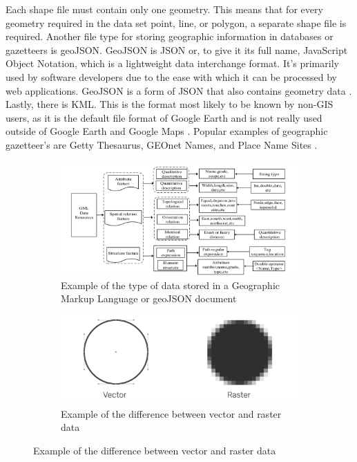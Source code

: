 \documentclass[10pt, conference, compsocconf]{IEEEtran}
\begin{document}
Each shape file must contain only one geometry. This means that for every geometry required in the data set point, line, or polygon, a separate shape file is required. Another file type for storing geographic information in databases or gazetteers is geoJSON. GeoJSON is JSON or, to give it its full name, JavaScript Object Notation, which is a lightweight data interchange format. It’s primarily used by software developers due to the ease with which it can be processed by web applications. GeoJSON is a form of JSON that also contains geometry data \cite{Butler:2016ev}. Lastly, there is KML. This is the format most likely to be known by non-GIS users, as it is the default file format of Google Earth and is not really used outside of Google Earth and Google Maps \cite{Long:2018ta}. Popular examples of geographic gazetteer's are Getty Thesaurus, GEOnet Names, and Place Name Sites \cite{Ding:1910wl}.  

\begin{figure}[h]
\centering
\begin{subfigure}[b]{0.4\textwidth}
\centering
\includegraphics[scale=.2]{images/example.png}
\caption{Example of the type of data stored in a Geographic Markup Language or geoJSON document}
\label{fig:example}

\end{subfigure}
\begin{subfigure}[b]{0.4\textwidth}
\centering
\includegraphics[scale=.2]{images/vec.png}
\caption{Example of the difference between vector and raster data}
\label{fig:vec}
\end{subfigure}
\end{figure}
\end{document}

